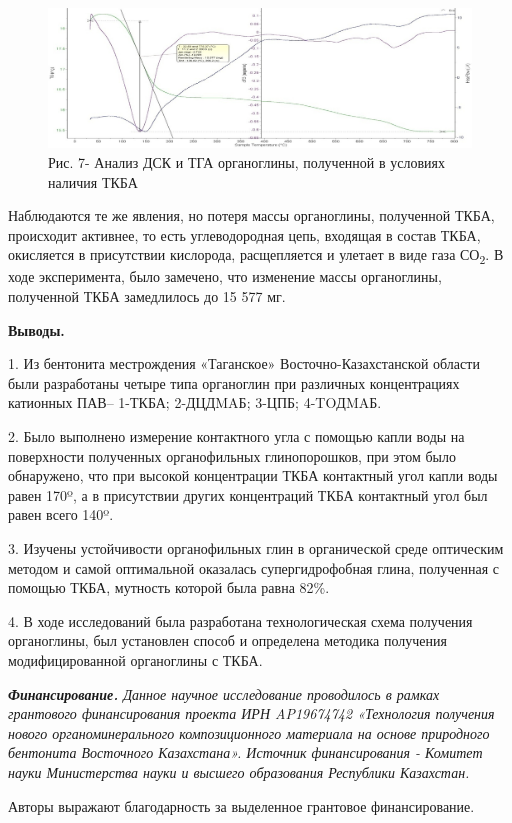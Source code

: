 \begin{figure}[H]
	\centering
	\includegraphics[width=\textwidth]{assets/1032}
	\caption*{Рис. 7- Анализ ДСК и ТГА органоглины, полученной в условиях наличия ТКБА}
\end{figure}

\begin{multicols}{2}
Наблюдаются те же явления, но потеря массы органоглины, полученной ТКБА,
происходит активнее, то есть углеводородная цепь, входящая в состав
ТКБА, окисляется в присутствии кислорода, расщепляется и улетает в виде
газа СО\textsubscript{2}. В ходе эксперимента, было замечено, что
изменение массы органоглины, полученной ТКБА замедлилось до 15 577 мг.

{\bfseries Выводы.}

1.
  Из бентонита местрождения «Таганское» Восточно-Казахстанской области
  были разработаны четыре типа органоглин при различных концентрациях
  катионных ПАВ-- 1-ТКБА; 2-ДЦДMAБ; 3-ЦПБ; 4-TOДMAБ.

2.
  Было выполнено измерение контактного угла с помощью капли воды на
  поверхности полученных органофильных глинопорошков, при этом было
  обнаружено, что при высокой концентрации ТКБА контактный угол капли
  воды равен 170º, а в присутствии других концентраций ТКБА контактный
  угол был равен всего 140º.

3.
  Изучены устойчивости органофильных глин в органической среде
  оптическим методом и самой оптимальной оказалась супергидрофобная
  глина, полученная с помощью ТКБА, мутность которой была равна 82\%.

4.
  В ходе исследований была разработана технологическая схема получения
  органоглины, был установлен способ и определена методика получения
  модифицированной органоглины с ТКБА.

\emph{{\bfseries Финансирование.} Данное научное исследование проводилось в
рамках грантового финансирования проекта ИРН AP19674742 «Технология
получения нового органоминерального композиционного материала на основе
природного бентонита Восточного Казахстана». Источник финансирования -
Комитет науки Министерства науки и высшего образования Республики
Казахстан.}

Авторы выражают благодарность за выделенное грантовое финансирование.
\end{multicols}

